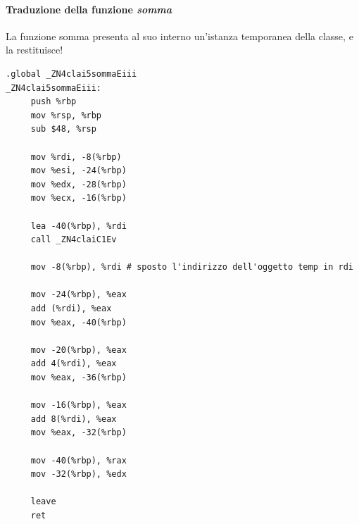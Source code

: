 \documentclass[11pt]{report}
\theoremstyle{definition}
\begin{document}
\paragraph{Traduzione della funzione \emph{somma}} La funzione somma presenta al suo interno un'istanza temporanea della classe, e la restituisce!
\begin{verbatim}
.global _ZN4clai5sommaEiii
_ZN4clai5sommaEiii:
     push %rbp
     mov %rsp, %rbp
     sub $48, %rsp
     
     mov %rdi, -8(%rbp)
     mov %esi, -24(%rbp)
     mov %edx, -28(%rbp)
     mov %ecx, -16(%rbp)
     
     lea -40(%rbp), %rdi
     call _ZN4claiC1Ev
     
     mov -8(%rbp), %rdi # sposto l'indirizzo dell'oggetto temp in rdi
     
     mov -24(%rbp), %eax 
     add (%rdi), %eax 
     mov %eax, -40(%rbp)
     
     mov -20(%rbp), %eax
     add 4(%rdi), %eax 
     mov %eax, -36(%rbp) 
     
     mov -16(%rbp), %eax 
     add 8(%rdi), %eax 
     mov %eax, -32(%rbp) 
      
     mov -40(%rbp), %rax
     mov -32(%rbp), %edx
     
     leave
     ret
\end{verbatim}
\end{document}
